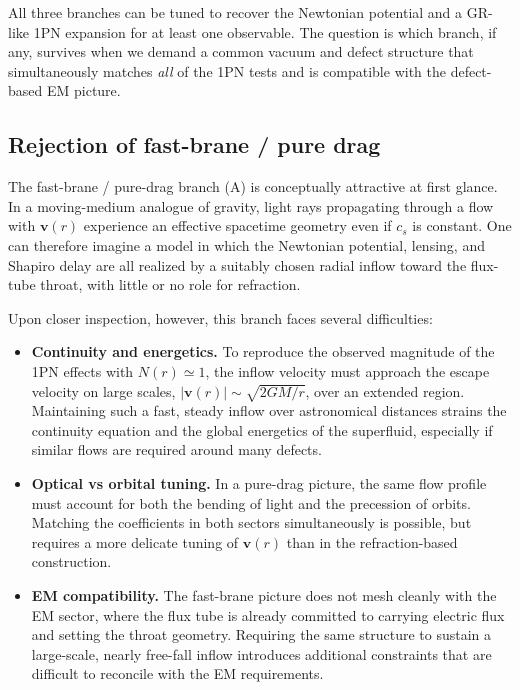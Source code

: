\documentclass[11pt]{article}
\begin{document}
All three branches can be tuned to recover the Newtonian potential and a
GR-like 1PN expansion for at least one observable.
The question is which branch, if any, survives when we demand a common
vacuum and defect structure that simultaneously matches \emph{all} of the
1PN tests and is compatible with the defect-based EM picture.


\subsection{Rejection of fast-brane / pure drag}
\label{subsec:degeneracies-fast-brane}

The fast-brane / pure-drag branch (A) is conceptually attractive at first
glance.
In a moving-medium analogue of gravity, light rays propagating through a
flow with $\mathbf{v}(r)$ experience an effective spacetime geometry even
if $c_s$ is constant.
One can therefore imagine a model in which the Newtonian potential,
lensing, and Shapiro delay are all realized by a suitably chosen
radial inflow toward the flux-tube throat, with little or no role for
refraction.

Upon closer inspection, however, this branch faces several difficulties:

\begin{itemize}
  \item \textbf{Continuity and energetics.}
        To reproduce the observed magnitude of the 1PN effects with
        $N(r)\simeq 1$, the inflow velocity must approach the escape
        velocity on large scales, $|\mathbf{v}(r)| \sim \sqrt{2GM/r}$,
        over an extended region.
        Maintaining such a fast, steady inflow over astronomical distances
        strains the continuity equation and the global energetics of the
        superfluid, especially if similar flows are required around many
        defects.

  \item \textbf{Optical vs orbital tuning.}
        In a pure-drag picture, the same flow profile must account for
        both the bending of light and the precession of orbits.
        Matching the coefficients in both sectors simultaneously is
        possible, but requires a more delicate tuning of $\mathbf{v}(r)$
        than in the refraction-based construction.

  \item \textbf{EM compatibility.}
        The fast-brane picture does not mesh cleanly with the EM sector,
        where the flux tube is already committed to carrying electric
        flux and setting the throat geometry.
        Requiring the same structure to sustain a large-scale, nearly
        free-fall inflow introduces additional constraints that are
        difficult to reconcile with the EM requirements.
\end{itemize}
\end{document}
